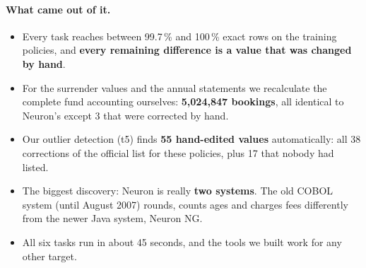 \documentclass[11pt,a4paper]{article}
\begin{document}
\begin{center}
\end{center}

\paragraph{What came out of it.}
\begin{itemize}
  \item Every task reaches between 99.7\,\% and 100\,\% exact rows on the training policies, and \textbf{every
        remaining difference is a value that was changed by hand}.
  \item For the surrender values and the annual statements we recalculate the complete fund accounting ourselves:
        \textbf{5,024,847 bookings}, all identical to Neuron's except 3 that were corrected by hand.
  \item Our outlier detection (t5) finds \textbf{55 hand-edited values} automatically: all 38 corrections of the
        official list for these policies, plus 17 that nobody had listed.
  \item The biggest discovery: Neuron is really \textbf{two systems}. The old COBOL system (until August 2007)
        rounds, counts ages and charges fees differently from the newer Java system, Neuron NG.
  \item All six tasks run in about 45 seconds, and the tools we built work for any other target.
\end{itemize}
\end{document}
